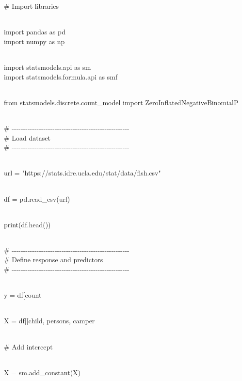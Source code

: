 \documentclass[
]{article}
\begin{document}
\# Import libraries\\
\strut \\
import pandas as pd\\
import numpy as np\\
\strut \\
import statsmodels.api as sm\\
import statsmodels.formula.api as smf\\
\strut \\
from statsmodels.discrete.count\_model import
ZeroInflatedNegativeBinomialP\\
\strut \\
\#
-\/-\/-\/-\/-\/-\/-\/-\/-\/-\/-\/-\/-\/-\/-\/-\/-\/-\/-\/-\/-\/-\/-\/-\/-\/-\/-\/-\/-\/-\/-\/-\/-\/-\/-\/-\/-\/-\/-\/-\/-\/-\/-\/-\/-\/-\/-\/-\/-\/-\/-\/-\\
\# Load dataset\\
\#
-\/-\/-\/-\/-\/-\/-\/-\/-\/-\/-\/-\/-\/-\/-\/-\/-\/-\/-\/-\/-\/-\/-\/-\/-\/-\/-\/-\/-\/-\/-\/-\/-\/-\/-\/-\/-\/-\/-\/-\/-\/-\/-\/-\/-\/-\/-\/-\/-\/-\/-\/-\\
\strut \\
url = "https://stats.idre.ucla.edu/stat/data/fish.csv"\\
\strut \\
df = pd.read\_csv(url)\\
\strut \\
print(df.head())\\
\strut \\
\#
-\/-\/-\/-\/-\/-\/-\/-\/-\/-\/-\/-\/-\/-\/-\/-\/-\/-\/-\/-\/-\/-\/-\/-\/-\/-\/-\/-\/-\/-\/-\/-\/-\/-\/-\/-\/-\/-\/-\/-\/-\/-\/-\/-\/-\/-\/-\/-\/-\/-\/-\/-\\
\# Define response and predictors\\
\#
-\/-\/-\/-\/-\/-\/-\/-\/-\/-\/-\/-\/-\/-\/-\/-\/-\/-\/-\/-\/-\/-\/-\/-\/-\/-\/-\/-\/-\/-\/-\/-\/-\/-\/-\/-\/-\/-\/-\/-\/-\/-\/-\/-\/-\/-\/-\/-\/-\/-\/-\/-\\
\strut \\
y = df{[}\textquotesingle count\textquotesingle{]}\\
\strut \\
X = df{[}{[}\textquotesingle child\textquotesingle,
\textquotesingle persons\textquotesingle,
\textquotesingle camper\textquotesingle{]}{]}\\
\strut \\
\# Add intercept\\
\strut \\
X = sm.add\_constant(X)\\
\end{document}
